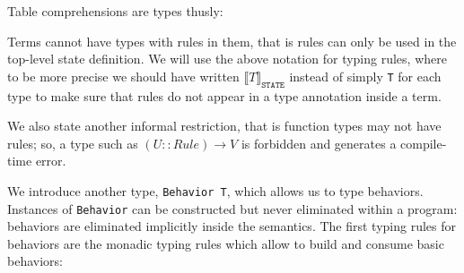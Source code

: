 Table comprehensions are types thusly:



Terms cannot have types with rules in them, that is rules can only be used in the top-level state definition. We will use the above notation for typing rules, where to be more precise we should have written $\llbracket T \rrbracket_{\mathtt{STATE}}$ instead of simply \texttt{T} for each type to make sure that rules do not appear in a type annotation inside a term.

We also state another informal restriction, that is function types may not have rules; so, a type such as $(U :: Rule) \rightarrow V$ is forbidden and generates a compile-time error.

We introduce another type, \texttt{Behavior T}, which allows us to type behaviors. Instances of \texttt{Behavior} can be constructed but never eliminated within a program: behaviors are eliminated implicitly inside the semantics. The first typing rules for behaviors are the monadic typing rules which allow to build and consume basic behaviors:


